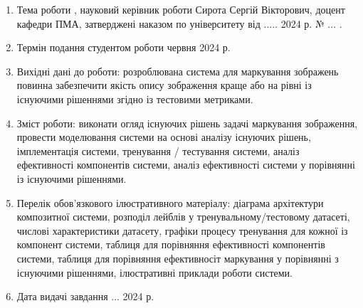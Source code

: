 \documentclass{udstu}
\begin{document}
\begin{enumerate}[1.]
	\item Тема роботи ,
	науковий керівник роботи Сирота Сергій Вікторович, доцент кафедри ПМА, затверджені наказом по університету
	від  ..... 2024 р. № ... .

	\item Термін подання студентом роботи  червня 2024 р.

	\item Вихідні дані до роботи: розроблювана система для маркування зображень повинна
	забезпечити якість опису зображення краще або на рівні із існуючими рішеннями згідно із
	тестовими метриками.

	\item Зміст роботи: виконати огляд існуючих рішень задачі маркування зображення,
	провести моделювання системи на основі аналізу існуючих рішень, імплементація системи,
	тренування / тестування системи, аналіз ефективності компонентів системи,
	аналіз ефективності системи у порівнянні із існуючими рішеннями.

	\item Перелік обов'язкового ілюстративного матеріалу: діаграма архітектури композитної системи,
	розподіл лейблів у тренувальному/тестовому датасеті, числові характеристики датасету,
	графіки процесу тренування для кожної із компонент системи,
	таблиця для порівняння ефективності компонентів системи,
	таблиця для порівняння ефективносіт маркування у порівнянні з існуючими рішеннями,
	ілюстративні приклади роботи системи.

	\item Дата видачі завдання  ... 2024 р.
\end{enumerate}
\end{document}
